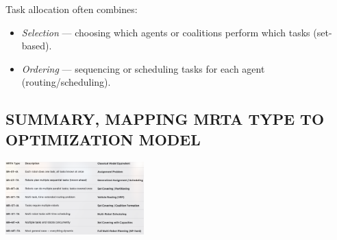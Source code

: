Task allocation often combines:
\begin{itemize}
    \item \textit{Selection} — choosing which agents or coalitions perform which tasks (set-based).
    \item \textit{Ordering} — sequencing or scheduling tasks for each agent (routing/scheduling).
\end{itemize}


\subsection*{SUMMARY, MAPPING MRTA TYPE TO OPTIMIZATION MODEL}

\begin{center}
    \includegraphics[width=0.4\textwidth]{images/MRTA_Summary.png}
\end{center}
